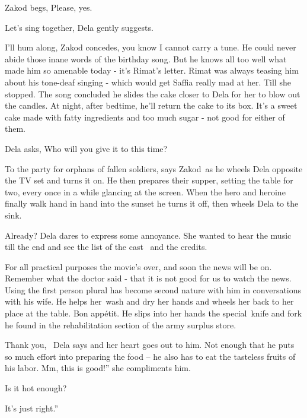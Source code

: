 \documentclass[letterpaper]{article}
\begin{document}
Zakod begs, {\textquotedbl}Please, yes.{\textquotedbl} 

{\textquotedbl}Let's sing together,{\textquotedbl} Dela gently suggests. 

{\textquotedbl}I'll hum along,{\textquotedbl} Zakod concedes, {\textquotedbl}you know I cannot carry a
tune.{\textquotedbl} He could never abide those inane words of the birthday song. But he knows all too well what made
him so amenable today - it's Rimat's letter. Rimat was always teasing him about his tone-deaf singing - which would get
Saffia really mad at her. Till she stopped. The song concluded he slides the cake closer to Dela for her to blow out
the candles. At night, after bedtime, he'll return the cake to its box. It's a sweet cake made with fatty ingredients
and too much sugar - not good for either of them.

Dela asks, {\textquotedbl}Who will you give it to this time?{\textquotedbl} 

{\textquotedbl}To the party for orphans of fallen soldiers,{\textquotedbl} says Zakod~as he wheels Dela opposite the TV
set and turns it on. He then prepares their supper, setting the table for two, every once in a while glancing at the
screen. When the hero and heroine finally walk hand in hand into the sunset he turns it off, then wheels Dela to the
sink.

{\textquotedbl}Already?{\textquotedbl} Dela dares to express some annoyance. She wanted to hear the music till the end
and see the list of the cast \ and the credits. 

{\textquotedbl}For all practical purposes the movie's over, and soon the news will be on. Remember what the doctor said
- that it is not good for us to watch the news.{\textquotedbl} Using the first person plural has become second nature
with him in conversations with his wife. He helps her~wash and dry her hands and wheels her back to her place at the
table. {\textquotedbl}Bon app\'etit.{\textquotedbl} He slips into her hands the special~knife and fork he found in the
rehabilitation section of the army surplus store. 

{\textquotedbl}Thank you,{\textquotedbl}~ Dela says and her heart goes out to him. Not enough that he puts so much
effort into preparing the food -- he also has to eat the tasteless fruits of his labor. {\textquotedbl}Mm, this is
good!'' she compliments him. 

{\textquotedbl}Is it hot enough?{\textquotedbl} 

{\textquotedbl}It's just right.'' 
\end{document}
